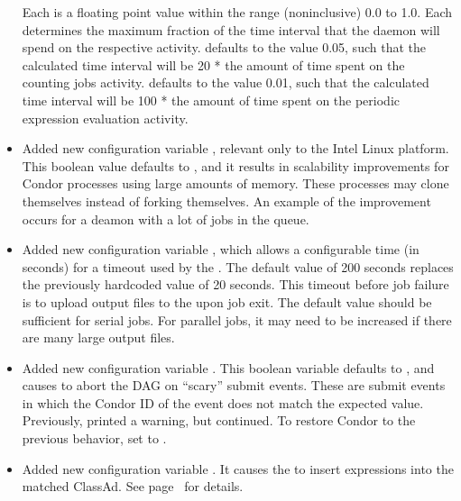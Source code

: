 \begin{itemize}
  Each is a floating point value within the range
  (noninclusive) 0.0 to 1.0.
  Each determines the maximum fraction of the time interval that the 
   daemon  will spend on the respective
  activity.
   defaults to the value 0.05,
  such that the calculated time interval will be 20 * the amount
  of time spent on the counting jobs activity.
   defaults to the value 0.01,
  such that the calculated time interval will be 100 * the amount
  of time spent on the periodic expression evaluation activity.

\item Added new configuration variable 
  , relevant only to the
  Intel Linux platform.  
  This boolean value defaults to , and it results in scalability
  improvements for Condor processes using large amounts of memory.
  These processes may clone themselves instead of forking themselves.
  An example of the improvement occurs for a 
  deamon with a lot of jobs in the queue.

\item Added new configuration variable ,
  which allows a configurable time (in seconds) for a timeout used by the 
  .
  The default value of 200 seconds replaces the previously hardcoded
  value of 20 seconds.
  This timeout before job failure is to upload output files to the
   upon job exit.
  The default value should be sufficient for serial jobs.
  For parallel jobs, it may need to
  be increased if there are many large output files.

\item Added new configuration variable .
  This boolean variable defaults to , and causes
   to abort the DAG on ``scary'' submit events.
  These are submit events in which
  the Condor ID of the event does not match the expected value.
  Previously,  printed a warning, but continued.
  To restore Condor to the previous behavior,
  set  to .

\item Added new configuration variable .
  It causes the  to
  insert expressions into the matched ClassAd.  See
  page~\pageref{param:NegotiatorMatchExprs} for details.


\end{itemize}
